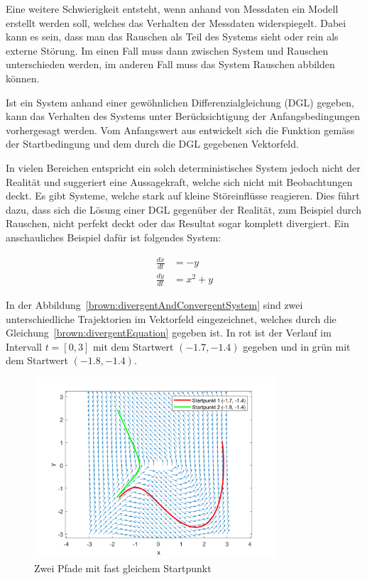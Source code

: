 Eine weitere Schwierigkeit entsteht, wenn anhand von Messdaten ein Modell erstellt werden soll, welches das Verhalten der Messdaten widerspiegelt. Dabei kann es sein, dass man das Rauschen als Teil des Systems sieht oder rein als externe Störung. Im einen Fall muss dann zwischen System und Rauschen unterschieden werden, im anderen Fall muss das System Rauschen abbilden können.

Ist ein System anhand einer gewöhnlichen Differenzialgleichung (DGL) gegeben, kann das Verhalten des Systems unter Berücksichtigung der Anfangsbedingungen vorhergesagt werden. Vom Anfangswert aus entwickelt sich die Funktion gemäss der Startbedingung und dem durch die DGL gegebenen Vektorfeld. 

In vielen Bereichen entspricht ein solch deterministisches System jedoch nicht der Realität und suggeriert eine Aussagekraft, welche sich nicht mit Beobachtungen deckt. Es gibt Systeme, welche stark auf kleine Störeinflüsse reagieren. Dies führt dazu, dass sich die Lösung einer DGL gegenüber der Realität, zum Beispiel durch Rauschen, nicht perfekt deckt oder das Resultat sogar komplett divergiert. Ein anschauliches Beispiel dafür ist folgendes System:

\begin{align}
	\frac{dx}{dt} &= -y \\
	\frac{dy}{dt} &= x^2 + y
	\label{brown:divergentEquation}
\end{align}

In der Abbildung~\ref{brown:divergentAndConvergentSystem} sind zwei unterschiedliche Trajektorien im Vektorfeld eingezeichnet, welches durch die Gleichung~\ref{brown:divergentEquation} gegeben ist. In rot ist der Verlauf im Intervall  $ t = [0, 3] $ mit dem Startwert $ (-1.7, -1.4) $ gegeben und in grün mit dem Startwert $ (-1.8, -1.4) $.

\begin{figure}
	\centering
	\includegraphics[width=0.8\textwidth]{papers/brown/images/Vektorfeld-mit-zwei-Pfaden.png}
	\caption{Zwei Pfade mit fast gleichem Startpunkt}
	\label{divergentAndConvergentSystem}
\end{figure}

